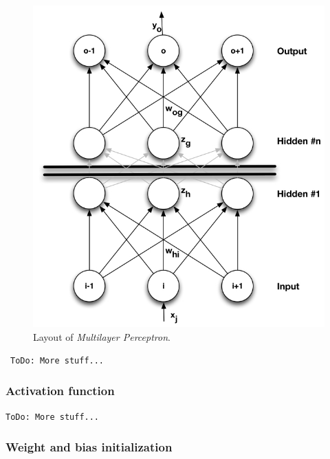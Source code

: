 \begin{figure}[ht] 
\begin{center}
\includegraphics{NeuralNet_InHidOut-full.jpg}
\caption{Layout of \textit{Multilayer Perceptron}.}
\label{NeuralNet_InHidHidOut_full}
\end{center}
\end{figure}


\
\texttt{ToDo: More stuff...}

\subsubsection{Activation function} \label{sss:activation_function}
\texttt{ToDo: More stuff...}


\subsubsection{Weight and bias initialization} \label{sss:weight_bias_initialization}

